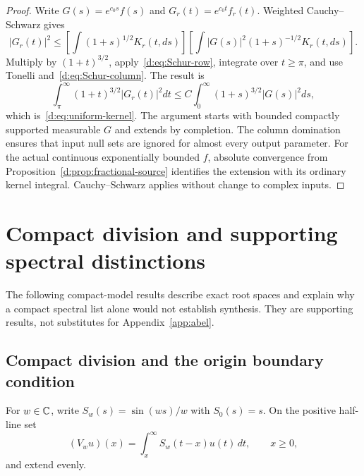 \documentclass[11pt,a4paper]{article}
\numberwithin{equation}{section}
\theoremstyle{definition}\newtheorem{definition}[theorem]{Definition}
\theoremstyle{remark}\newtheorem{remark}[theorem]{Remark}
\begin{document}
\begin{proof}
Write $G(s)=e^{c_0s}f(s)$ and $G_r(t)=e^{c_0t}f_r(t)$. Weighted Cauchy--Schwarz gives
\[
 |G_r(t)|^2
 \le\left[\int(1+s)^{1/2}K_r(t,ds)\right]
       \left[\int |G(s)|^2(1+s)^{-1/2}K_r(t,ds)\right].
\]
Multiply by $(1+t)^{3/2}$, apply~\eqref{d:eq:Schur-row}, integrate over $t\ge\pi$, and use Tonelli and~\eqref{d:eq:Schur-column}. The result is
\[
 \int_\pi^\infty(1+t)^{3/2}|G_r(t)|^2dt
 \le C\int_0^\infty(1+s)^{3/2}|G(s)|^2ds,
\]
which is~\eqref{d:eq:uniform-kernel}. The argument starts with bounded compactly supported measurable $G$ and extends by completion. The column domination ensures that input null sets are ignored for almost every output parameter. For the actual continuous exponentially bounded $f$, absolute convergence from Proposition~\ref{d:prop:fractional-source} identifies the extension with its ordinary kernel integral. Cauchy--Schwarz applies without change to complex inputs.
\end{proof}


\section{Compact division and supporting spectral distinctions}\label{app:compactmodel}
The following compact-model results describe exact root spaces and explain why a compact spectral list alone would not establish synthesis. They are supporting results, not substitutes for Appendix~\ref{app:abel}.


\subsection{Compact division and the origin boundary condition}\label{d:sec:division}

For $w\in\mathbb C$, write $S_w(s)=\sin(ws)/w$ with $S_0(s)=s$. On the positive half-line set
\begin{equation}\label{d:eq:V-definition}
 (V_wu)(x)=\int_x^\infty S_w(t-x)u(t)\,dt,\qquad x\ge0,
\end{equation}
and extend evenly.
\end{document}
